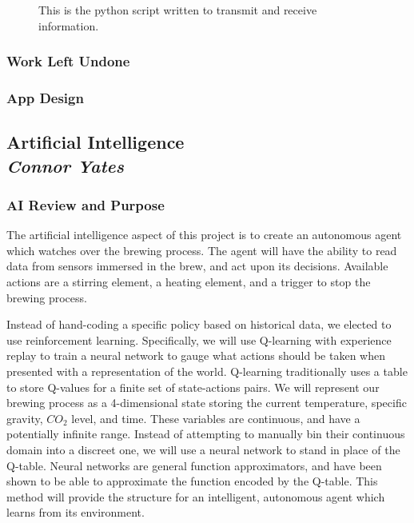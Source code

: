 \documentclass[draftclsnofoot,onecolumn,letterpaper,10pt]{IEEEtran}
\begin{document}
\begin{figure}
\label{fig:python}
\caption{This is the python script written to transmit and receive information.}
\end{figure}

\vfill
\clearpage
\subsubsection{Work Left Undone}

\subsubsection{App Design}


\subsection{Artificial Intelligence\\{\em\textbf{Connor Yates}}}
\subsubsection{AI Review and Purpose}
The artificial intelligence aspect of this project is to create an autonomous agent which watches over the brewing process.
The agent will have the ability to read data from sensors immersed in the brew, and act upon its decisions.
Available actions are a stirring element, a heating element, and a trigger to stop the brewing process.

Instead of hand-coding a specific policy based on historical data, we elected to use reinforcement learning.
Specifically, we will use Q-learning with experience replay to train a neural network to gauge what actions should be taken when presented with a representation of the world.
Q-learning traditionally uses a table to store Q-values for a finite set of state-actions pairs.
We will represent our brewing process as a 4-dimensional state storing the current temperature, specific gravity, $CO_2$ level, and time.
These variables are continuous, and have a potentially infinite range.
Instead of attempting to manually bin their continuous domain into a discreet one, we will use a neural network to stand in place of the Q-table.
Neural networks are general function approximators, and have been shown to be able to approximate the function encoded by the Q-table.
This method will provide the structure for an intelligent, autonomous agent which learns from its environment.
\end{document}
